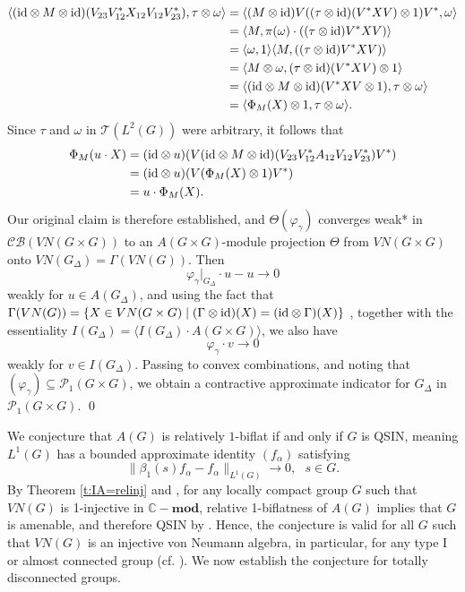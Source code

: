 \documentclass[preprint,12pt]{elsarticle}
\newcommand{\mc}[1]{\mathcal{#1}}
\newcommand{\la}{\langle}
\newcommand{\ra}{\rangle}
\newcommand{\LO}{L^1(G)}
\newcommand{\TC}{\mc{T}(L^2(G))}
\newcommand{\vphi}{\varphi}
\newcommand{\Gam}{\Gamma}
\newcommand{\om}{\omega}
\newcommand{\ten}{\otimes}
\newcommand{\id}{\textnormal{id}}
\providecommand{\norm}[1]{\lVert#1\rVert}
\newcommand{\C}{\mathbb{C}}
\begin{document}
\begin{pf}
\begin{align*}\la(\id\ten M\ten\id)(V_{23}V_{12}^*X_{12}V_{12}V_{23}^*),\tau\ten\om\ra&=\la(M\ten\id)V((\tau\ten\id)(V^*XV)\ten1)V^*,\om\ra\\
                                                                          &=\la M,\pi(\om)\cdot((\tau\ten\id)V^*XV)\ra\\
                                                                          &=\la\om,1\ra\la M,((\tau\ten\id)V^*XV)\ra\\
                                                                          &=\la M\ten\om,(\tau\ten\id)(V^*XV)\ten 1\ra\\
                                                                          &=\la(\id\ten M\ten\id)(V^*XV\ten 1),\tau\ten\om\ra\\
                                                                          &=\la\Phi_M(X)\ten 1,\tau\ten\om\ra.
                                                                          \end{align*}
Since $\tau$ and $\om$ in $\TC$ were arbitrary, it follows that
\begin{align*}\Phi_M(u \cdot X)&=(\id\ten u)(V(\id\ten M\ten\id)(V_{23}V_{12}^*A_{12}V_{12}V_{23}^*)V^*)\\
                              &=(\id\ten u)(V(\Phi_M(X)\ten 1)V^*)\\
                              &= u\cdot \Phi_M(X).\end{align*}
Our original claim is therefore established, and $\Theta(\vphi_\gamma)$ converges weak* in $\mc{CB}(VN(G\times G))$ to an $A(G\times G)$-module projection $\Theta$ from $VN(G\times G)$ onto $VN(G_\Delta)=\Gam(VN(G))$. Then
$$\vphi_{\gamma}|_{G_\Delta}\cdot u-u\rightarrow 0$$
weakly for $u\in A(G_\Delta)$, and using the fact that $\Gam(VN(G))=\{X\in VN(G\times G)\mid (\Gam\ten\id)(X)=(\id\ten\Gam)(X)\}$ \cite[Theorem 6.5]{D4}, together with the essentiality $I(G_\Delta)=\la I(G_\Delta)\cdot A(G\times G)\ra$, we also have
$$\vphi_{\gamma}\cdot v\rightarrow 0$$
weakly for $v\in I(G_\Delta)$. Passing to convex combinations, and noting that $(\vphi_\gamma)\subseteq\mc{P}_1(G\times G)$, we obtain a contractive approximate indicator for $G_\Delta$ in $\mc{P}_1(G\times G)$.
\qed\end{pf}


We conjecture that $A(G)$ is relatively $1$-biflat if and only if $G$ is QSIN, meaning $\LO$ has a bounded approximate identity $(f_\alpha)$ satisfying
$$\norm{\beta_1(s)f_\alpha - f_\alpha}_{\LO}\rightarrow0, \ \ \ s\in G.$$
By Theorem \ref{t:IA=relinj}    and \cite[Corollary 3.2]{LP1}, for any locally compact group $G$ such that $VN(G)$ is 1-injective in $\C-\mathbf{mod}$, relative 1-biflatness of $A(G)$ implies that $G$ is amenable, and therefore QSIN by \cite[Theorem 3]{LR}. Hence, the conjecture is valid for all $G$ such that $VN(G)$ is an injective von Neumann algebra, in particular, for any type I or almost connected group (cf. \cite{Pat3}). We now establish the conjecture for totally disconnected groups.
\end{document}
